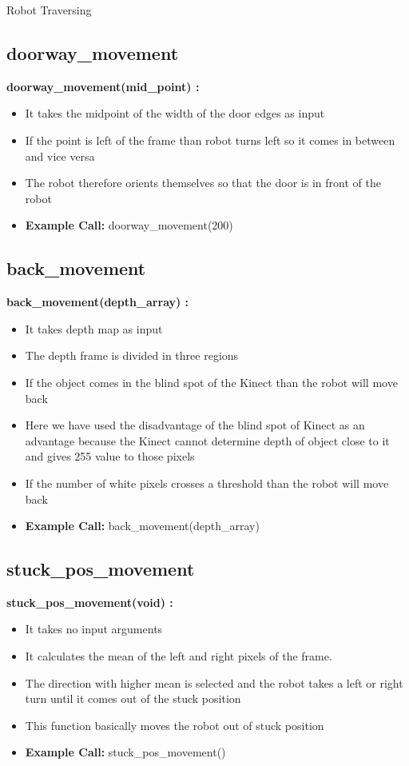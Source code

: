 \documentclass[10pt, a4paper]{beamer}
\begin{document}
\begin{frame}[allowframebreaks]{Robot Traversing}
  \subsection{doorway\_movement}
    \textbf{doorway\_movement(mid\_point) : }
      \begin{itemize}
       \item It takes the midpoint of the width of the door edges as input
       \item If the point is left of the frame than robot turns left so it comes in between and vice versa
       \item The robot therefore orients themselves so that the door is in front of the robot
       \item \textbf{Example Call:} doorway\_movement(200)
      \end{itemize}
  \framebreak
  \subsection{back\_movement}
    \textbf{back\_movement(depth\_array) : }
      \begin{itemize}
       \item It takes depth map as input
       \item The depth frame is divided in three regions
       \item If the object comes in the blind spot of the Kinect than the robot will move back
       \item Here we have used the disadvantage of the blind spot of Kinect as an advantage because the Kinect cannot determine depth of object close to it and gives 255 value to those pixels
       \item If the number of white pixels crosses a threshold than the robot will move back
       \item \textbf{Example Call:} back\_movement(depth\_array)
      \end{itemize}
   \framebreak
  \subsection{stuck\_pos\_movement}
    \textbf{stuck\_pos\_movement(void) : }
      \begin{itemize}
       \item It takes no input arguments
       \item It calculates the mean of the left and right pixels of the frame. 
       \item The direction with higher mean is selected and the robot takes a left or right turn until it comes out of the stuck position
       \item This function basically moves the robot out of stuck position
       \item \textbf{Example Call:} stuck\_pos\_movement()
      \end{itemize}
  \framebreak

\end{frame}
\end{document}
